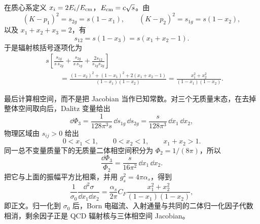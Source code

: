 \begin{derivation}[三喷注产生的能量分布]
在质心系定义 $x_i=2E_i/E_{\rm cm}$，$E_{\rm cm}=c\sqrt s$。由
\begin{equation*}
(K-p_1)^2=s_{2g}=s(1-x_1),\qquad
(K-p_2)^2=s_{1g}=s(1-x_2),
\end{equation*}
以及 $x_1+x_2+x_3=2$，有
\begin{equation*}
s_{12}=s(1-x_3)=s(x_1+x_2-1).
\end{equation*}
于是辐射核括号逐项化为
\begin{align*}
&s\left[
\frac{s_{1g}}{s\,s_{2g}}
+\frac{s_{2g}}{s\,s_{1g}}
+\frac{2s_{12}}{s_{1g}s_{2g}}
\right]\\
&\qquad=
\frac{(1-x_2)^2+(1-x_1)^2+2(x_1+x_2-1)}{(1-x_1)(1-x_2)}
=\frac{x_1^2+x_2^2}{(1-x_1)(1-x_2)}.
\end{align*}

最后计算相空间，而不是把 Jacobian 当作已知常数。对三个无质量末态，在去掉整体空间取向后，Dalitz 变量给出
\begin{equation*}
\dd\Phi_3
=\frac{1}{128\pi^3s}\,\dd s_{1g}\,\dd s_{2g}
=\frac{s}{128\pi^3}\,\dd x_1\,\dd x_2,
\end{equation*}
物理区域由 $s_{ij}>0$ 给出
\begin{equation*}
0<x_1<1,\qquad0<x_2<1,\qquad x_1+x_2>1.
\end{equation*}
同一总不变量质量下的无质量二体相空间积分为 $\Phi_2=1/(8\pi)$，所以
\begin{equation*}
\frac{\dd\Phi_3}{\Phi_2}
=\frac{s}{16\pi^2}\,\dd x_1\,\dd x_2.
\end{equation*}
把它与上面的振幅平方比相乘，并用 $g_s^2=4\pi\alpha_s$，得到
\begin{equation*}
\frac1{\sigma_0}
\frac{\dd^2\sigma}{\dd x_1\dd x_2}
=\frac{\alpha_s}{2\pi}C_F
\frac{x_1^2+x_2^2}{(1-x_1)(1-x_2)},
\end{equation*}
即正文。归一化到 $\sigma_0$ 后，Born 电磁流、入射通量与共同的二体归一化因子代数相消，剩余因子正是 QCD 辐射核与三体相空间 Jacobian。
\end{derivation}

